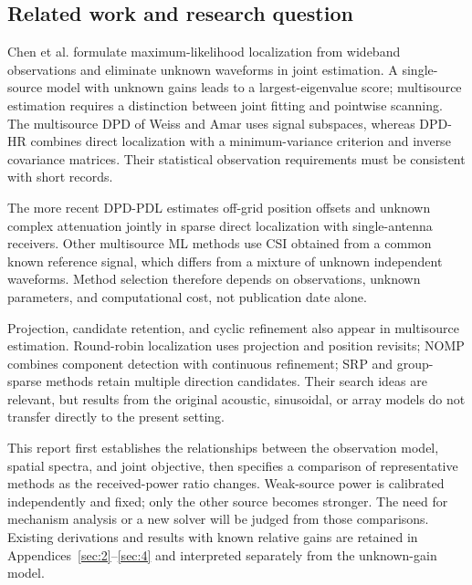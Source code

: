 \documentclass[11pt,a4paper]{article}
\numberwithin{equation}{section}
\numberwithin{figure}{section}
\numberwithin{table}{section}
\begin{document}
\subsection{Related work and research question}\label{sec:1.3}
Chen et al. formulate maximum-likelihood localization from wideband observations and eliminate unknown waveforms in joint estimation\cite{ref05}. A single-source model with unknown gains leads to a largest-eigenvalue score; multisource estimation requires a distinction between joint fitting and pointwise scanning. The multisource DPD of Weiss and Amar uses signal subspaces\cite{ref04}, whereas DPD-HR combines direct localization with a minimum-variance criterion and inverse covariance matrices\cite{ref06}. Their statistical observation requirements must be consistent with short records.

The more recent DPD-PDL estimates off-grid position offsets and unknown complex attenuation jointly in sparse direct localization with single-antenna receivers\cite{ref13}. Other multisource ML methods use CSI obtained from a common known reference signal\cite{ref14}, which differs from a mixture of unknown independent waveforms. Method selection therefore depends on observations, unknown parameters, and computational cost, not publication date alone.

Projection, candidate retention, and cyclic refinement also appear in multisource estimation. Round-robin localization uses projection and position revisits\cite{ref07}; NOMP combines component detection with continuous refinement\cite{ref08}; SRP and group-sparse methods retain multiple direction candidates\cite{ref09}. Their search ideas are relevant, but results from the original acoustic, sinusoidal, or array models do not transfer directly to the present setting.

This report first establishes the relationships between the observation model, spatial spectra, and joint objective, then specifies a comparison of representative methods as the received-power ratio changes. Weak-source power is calibrated independently and fixed; only the other source becomes stronger. The need for mechanism analysis or a new solver will be judged from those comparisons. Existing derivations and results with known relative gains are retained in Appendices~\ref{sec:2}--\ref{sec:4} and interpreted separately from the unknown-gain model.



\clearpage
\end{document}

